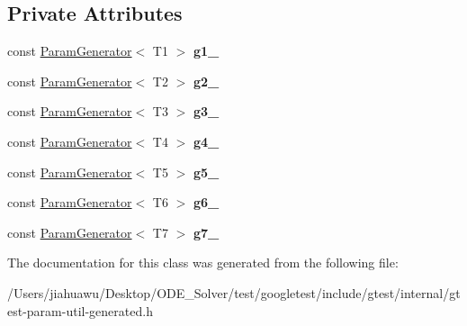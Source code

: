 \subsection*{Private Attributes}
\begin{DoxyCompactItemize}
\item 
\mbox{\label{classtesting_1_1internal_1_1_cartesian_product_generator7_ad8ec75a361810570feb4f6c0699f7f76}} 
const \mbox{\hyperlink{classtesting_1_1internal_1_1_param_generator}{Param\+Generator}}$<$ T1 $>$ {\bfseries g1\+\_\+}
\item 
\mbox{\label{classtesting_1_1internal_1_1_cartesian_product_generator7_a2e094d1b0e7d99b28828475c9871f4e3}} 
const \mbox{\hyperlink{classtesting_1_1internal_1_1_param_generator}{Param\+Generator}}$<$ T2 $>$ {\bfseries g2\+\_\+}
\item 
\mbox{\label{classtesting_1_1internal_1_1_cartesian_product_generator7_a24a56a59e1f27f5a97d8ed231bb48d6f}} 
const \mbox{\hyperlink{classtesting_1_1internal_1_1_param_generator}{Param\+Generator}}$<$ T3 $>$ {\bfseries g3\+\_\+}
\item 
\mbox{\label{classtesting_1_1internal_1_1_cartesian_product_generator7_ae5c1eac036b8355439f7eb411e639355}} 
const \mbox{\hyperlink{classtesting_1_1internal_1_1_param_generator}{Param\+Generator}}$<$ T4 $>$ {\bfseries g4\+\_\+}
\item 
\mbox{\label{classtesting_1_1internal_1_1_cartesian_product_generator7_a606bdd6a8bb57eb65172455b0ea6b78f}} 
const \mbox{\hyperlink{classtesting_1_1internal_1_1_param_generator}{Param\+Generator}}$<$ T5 $>$ {\bfseries g5\+\_\+}
\item 
\mbox{\label{classtesting_1_1internal_1_1_cartesian_product_generator7_a37eac7a1d8524cd43bbfe9d6aaa69901}} 
const \mbox{\hyperlink{classtesting_1_1internal_1_1_param_generator}{Param\+Generator}}$<$ T6 $>$ {\bfseries g6\+\_\+}
\item 
\mbox{\label{classtesting_1_1internal_1_1_cartesian_product_generator7_a77db4fd537002107c3116a09e1895c84}} 
const \mbox{\hyperlink{classtesting_1_1internal_1_1_param_generator}{Param\+Generator}}$<$ T7 $>$ {\bfseries g7\+\_\+}
\end{DoxyCompactItemize}


The documentation for this class was generated from the following file\+:\begin{DoxyCompactItemize}
\item 
/\+Users/jiahuawu/\+Desktop/\+O\+D\+E\+\_\+\+Solver/test/googletest/include/gtest/internal/gtest-\/param-\/util-\/generated.\+h\end{DoxyCompactItemize}
